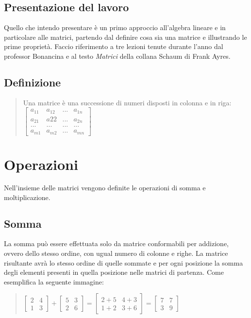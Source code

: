 \documentclass[a4paper]{article}
\begin{document}
\subsection{Presentazione del lavoro}
Quello che intendo presentare è un primo approccio all’algebra lineare e in particolare alle matrici, partendo dal definire cosa sia una matrice e illustrando le prime proprietà. Faccio riferimento a tre lezioni tenute durante l’anno dal professor Bonancina e al testo {\it Matrici} della collana Schaum di Frank Ayres.

\subsection{Definizione}

\vspace*{\fill} 
\begin{quote} 
\centering 
Una matrice è una successione di numeri disposti in colonna e in riga:
\bigskip \\
$\left[\begin{matrix}a_{11} & a_{12} & ... & a_{1n} \\ a_{21} & a{22} & ... & a_{2n} \\ ... & ... & ... & ...\\ a_{m1} & a_{m2} & ... & a_{mn}\end{matrix}\right]
$
\end{quote}
\vspace*{\fill}

\section{Operazioni}
Nell'insieme delle matrici vengono definite le operazioni di somma e moltiplicazione.

\subsection{Somma}
La somma può essere effettuata solo da matrice conformabili per addizione, ovvero dello stesso ordine, con ugual numero di colonne e righe. La matrice risultante avrà lo stesso ordine di quelle sommate e per ogni posizione la somma degli elementi presenti in quella posizione nelle matrici di partenza. Come esemplifica la seguente immagine:
\\
\begin{quote} \centering $\left[\begin{matrix}2 & 4 \\ 1 & 3\end{matrix}\right] + \left[\begin{matrix}5 & 3 \\ 2 & 6\end{matrix}\right] = \left[\begin{matrix} 2+5 & 4+3 \\ 1+2 & 3+6\end{matrix}\right] = \left[\begin{matrix}7 & 7 \\ 3 & 9\end{matrix}\right]
$\end{quote}
\end{document}
